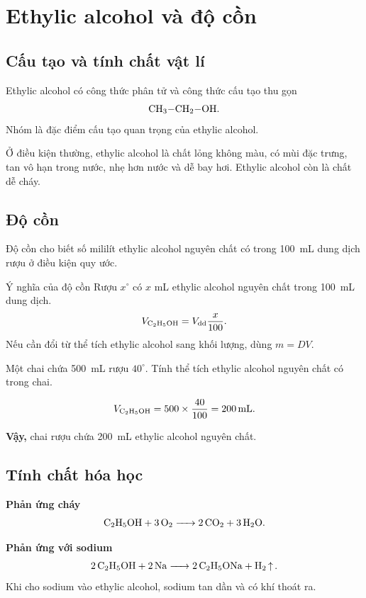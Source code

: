 \section{Ethylic alcohol và độ cồn}

\subsection{Cấu tạo và tính chất vật lí}

Ethylic alcohol có công thức phân tử  và công thức cấu tạo thu gọn
\[
\ce{CH3-CH2-OH}.
\]
Nhóm  là đặc điểm cấu tạo quan trọng của ethylic alcohol.

Ở điều kiện thường, ethylic alcohol là chất lỏng không màu, có mùi đặc trưng, tan vô hạn trong nước, nhẹ hơn nước và dễ bay hơi. Ethylic alcohol còn là chất dễ cháy.

\subsection{Độ cồn}

Độ cồn cho biết số mililít ethylic alcohol nguyên chất có trong \SI{100}{\milli\liter} dung dịch rượu ở điều kiện quy ước.

\begin{ghinho}{Ý nghĩa của độ cồn}
Rượu $x^\circ$ có $x$ mL ethylic alcohol nguyên chất trong \SI{100}{\milli\liter} dung dịch.
\[
V_{\ce{C2H5OH}}=V_{\text{dd}}\frac{x}{100}.
\]
Nếu cần đổi từ thể tích ethylic alcohol sang khối lượng, dùng $m=DV$.
\end{ghinho}

\begin{vidu}
Một chai chứa \SI{500}{\milli\liter} rượu $40^\circ$. Tính thể tích ethylic alcohol nguyên chất có trong chai.
\end{vidu}
\begin{loigiai}
\[
V_{\ce{C2H5OH}}=500\times\frac{40}{100}=\SI{200}{\milli\liter}.
\]

\textbf{Vậy,} chai rượu chứa \SI{200}{\milli\liter} ethylic alcohol nguyên chất.
\end{loigiai}

\subsection{Tính chất hóa học}

\textbf{Phản ứng cháy}
\[
\ce{C2H5OH + 3O2 -> 2CO2 + 3H2O}.
\]

\textbf{Phản ứng với sodium}
\[
\ce{2C2H5OH + 2Na -> 2C2H5ONa + H2 ^}.
\]
Khi cho sodium vào ethylic alcohol, sodium tan dần và có khí thoát ra.

